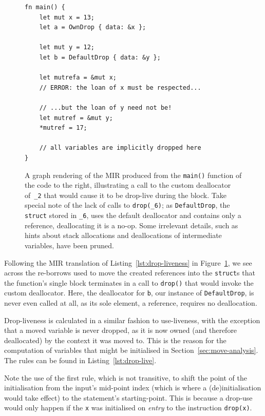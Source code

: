 \documentclass[11pt,a4paper,twoside,openany]{report}
\newenvironment{sourcecode}{\captionsetup{type=listing}}{}
\newcommand{\InRust}[1]{\texttt{#1}}
\begin{document}
\begin{figure}
\begin{minipage}{.5\textwidth}
\begin{sourcecode}
\begin{verbatim}
fn main() {
    let mut x = 13;
    let a = OwnDrop { data: &x };

    let mut y = 12;
    let b = DefaultDrop { data: &y };
    
    let mutrefa = &mut x;
    // ERROR: the loan of x must be respected...
    
    // ...but the loan of y need not be!
    let mutref = &mut y;
    *mutref = 17;
    
    // all variables are implicitly dropped here
}
\end{verbatim}
\end{sourcecode}
\end{minipage}
\caption[MIR of a Program Utilising a Custom Deallocator]{A graph rendering of
  the MIR produced from the \InRust{main()} function of the code to the right,
  illustrating a call to the custom deallocator of~\InRust{_2} that would cause
  it to be drop-live during the block. Take special note of the lack of calls to
  \InRust{drop(_6)}; as \InRust{DefaultDrop}, the \InRust{struct} stored in
  \InRust{_6}, uses the default deallocator and contains only a reference,
  deallocating it is a no-op. Some irrelevant details, such as hints about stack
  allocations and deallocations of intermediate variables, have been pruned.}
  \label{fig:drop-liveness}
\end{figure}

Following the MIR translation of Listing~\ref{lst:drop-liveness} in
Figure~\ref{fig:drop-liveness}, we see across the re-borrows used to move the
created references into the \InRust{struct}s that the function's single block
terminates in a call to \InRust{drop()} that would invoke the custom
deallocator. Here, the deallocator for \InRust{b}, our instance of
\InRust{DefaultDrop}, is never even called at all, as its sole element, a
reference, requires no deallocation.

Drop-liveness is calculated in a similar fashion to use-liveness, with the
exception that a moved variable is never dropped, as it is now owned (and
therefore deallocated) by the context it was moved to. This is the reason for
the computation of variables that might be initialised in
Section~\ref{sec:move-analysis}. The rules can be found in
Listing~\ref{lst:drop-live}.

Note the use of the first rule, which is not transitive, to shift the point of
the initialisation from the input's mid-point index (which is where a
(de)initialisation would take effect) to the statement's starting-point. This is
because a drop-use would only happen if the \InRust{x} was initialised on
\textit{entry} to the instruction \InRust{drop(x)}.
\end{document}
